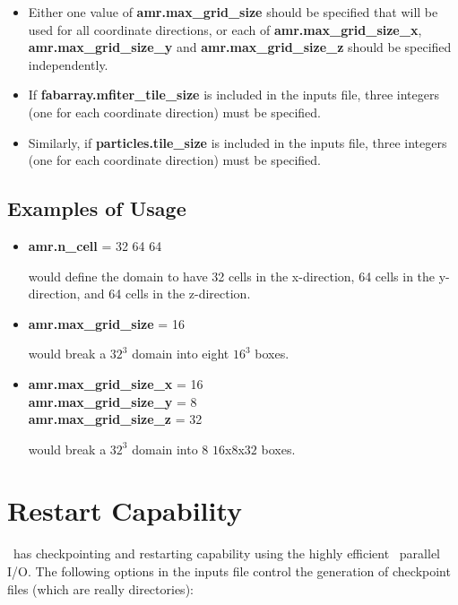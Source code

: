 \begin{itemize}

\item Either one value of {\bf amr.max\_grid\_size} should be specified that will be used for
all coordinate directions,  or each of 
{\bf amr.max\_grid\_size\_x}, {\bf amr.max\_grid\_size\_y} and {\bf amr.max\_grid\_size\_z}
should be specified independently.

\item If {\bf fabarray.mfiter\_tile\_size} is included in the inputs file, three integers (one for each coordinate direction)
must be specified.  

\item Similarly, if {\bf particles.tile\_size} is included in the inputs file, three integers (one for each coordinate direction)
must be specified.  

\end{itemize}

\subsection{Examples of Usage}

\begin{itemize}

\item {\bf amr.n\_cell} = 32 64 64

would define the domain to have 32 cells in the x-direction, 64 cells in the y-direction, 
and 64 cells in the z-direction.

\item {\bf amr.max\_grid\_size} = 16

would break a $32^3$ domain into eight $16^3$ boxes.

\item {\bf amr.max\_grid\_size\_x} = 16 \\
      {\bf amr.max\_grid\_size\_y} =  8 \\
      {\bf amr.max\_grid\_size\_z} = 32

would break a $32^3$ domain into 8 $16$x$8$x$32$ boxes.

\end{itemize}

\section{Restart Capability}

\mfix\ has checkpointing and restarting capability using the highly efficient \amrex\ parallel I/O.
The following options in the inputs file control the generation of checkpoint files (which are really
directories):\\

